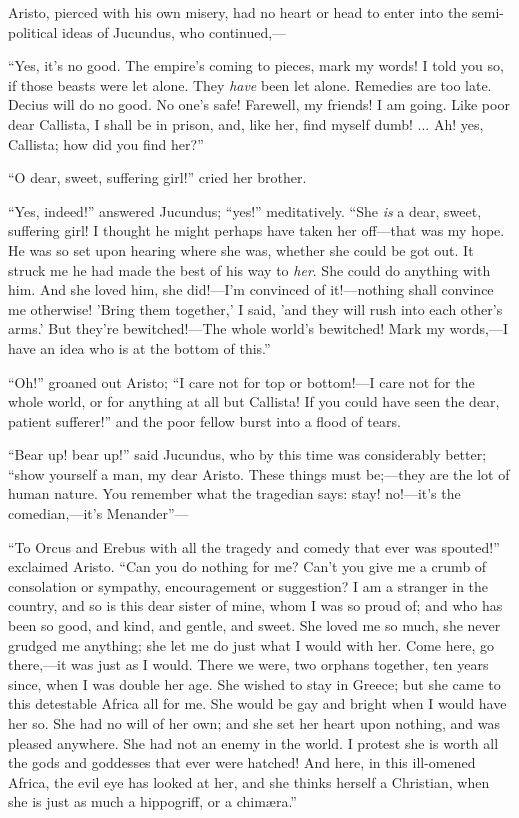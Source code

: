 Aristo, pierced with his own misery, had no heart or head to enter
into the semi-political ideas of Jucundus, who continued,—

``Yes, it's no good. The empire's coming to pieces, mark my
words! I told you so, if those beasts were let alone. They \emph{have}
been let alone. Remedies are too late. Decius will do no good. No one's
safe! Farewell, my friends! I am going. Like poor dear Callista, I
shall be in prison, and, like her, find myself dumb! ... Ah! yes,
Callista; how did you find her?''

``O dear, sweet, suffering girl!'' cried her brother.

``Yes, indeed!'' answered Jucundus; ``yes!''
meditatively. ``She \emph{is} a dear, sweet, suffering girl! I
thought he might perhaps have taken her off—that was my hope. He was
so set upon hearing where she was, whether she could be got out. It
struck me he had made the best of his way to \emph{her}. She could do
anything with him. And she loved him, she did!—I'm convinced of it!—nothing
shall convince me otherwise! 'Bring them together,' I said, 'and they
will rush into each other's arms.' But they're bewitched!—The whole
world's bewitched! Mark my words,—I have an idea who is at the
bottom of this.''

``Oh!'' groaned out Aristo; ``I care not for top or
bottom!—I care not for the whole world, or for anything at all but
Callista! If you could have seen the dear, patient sufferer!'' and
the poor fellow burst into a flood of tears.

``Bear up! bear up!'' said Jucundus, who by this time was
considerably better; ``show yourself a man, my dear Aristo. These
things must be;—they are the lot of human nature. You remember
what the tragedian says: stay! no!—it's the comedian,—it's
Menander''—

``To Orcus and Erebus with all the tragedy and comedy that ever
was spouted!'' exclaimed Aristo. ``Can you do nothing for me?
Can't you give me a crumb of consolation or sympathy, encouragement or
suggestion? I am a stranger in the country, and so is this dear sister
of mine, whom I was so proud of; and who has been so good, and kind,
and gentle, and sweet. She loved me so much, she never grudged me
anything; she let me do just what I would with her. Come here, go
there,—it was just as I would. There we were, two orphans together,
ten years since, when I was double her age. She wished to stay in
Greece; but she came to this detestable Africa all for me. She would
be gay and bright when I would have her so. She had no will of her
own; and she set her heart upon nothing, and was pleased anywhere. She
had not an enemy in the world. I protest she is worth all the gods and
goddesses that ever were hatched! And here, in this ill-omened Africa,
the evil eye has looked at her, and she thinks herself a Christian,
when she is just as much a hippogriff, or a chimæra.''

